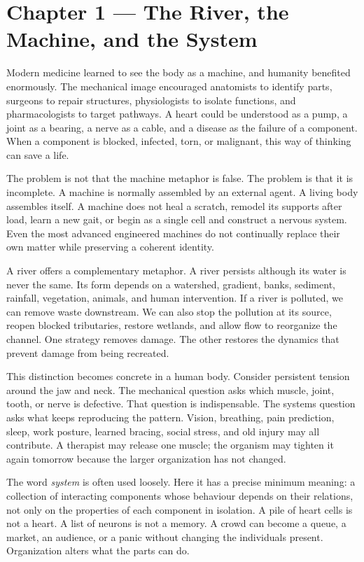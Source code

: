 \chapter{Chapter 1 --- The River, the Machine, and the System}\label{chapter-1-the-river-the-machine-and-the-system}

Modern medicine learned to see the body as a machine, and humanity benefited enormously. The mechanical image encouraged anatomists to identify parts, surgeons to repair structures, physiologists to isolate functions, and pharmacologists to target pathways. A heart could be understood as a pump, a joint as a bearing, a nerve as a cable, and a disease as the failure of a component. When a component is blocked, infected, torn, or malignant, this way of thinking can save a life.

The problem is not that the machine metaphor is false. The problem is that it is incomplete. A machine is normally assembled by an external agent. A living body assembles itself. A machine does not heal a scratch, remodel its supports after load, learn a new gait, or begin as a single cell and construct a nervous system. Even the most advanced engineered machines do not continually replace their own matter while preserving a coherent identity.

A river offers a complementary metaphor. A river persists although its water is never the same. Its form depends on a watershed, gradient, banks, sediment, rainfall, vegetation, animals, and human intervention. If a river is polluted, we can remove waste downstream. We can also stop the pollution at its source, reopen blocked tributaries, restore wetlands, and allow flow to reorganize the channel. One strategy removes damage. The other restores the dynamics that prevent damage from being recreated.

This distinction becomes concrete in a human body. Consider persistent tension around the jaw and neck. The mechanical question asks which muscle, joint, tooth, or nerve is defective. That question is indispensable. The systems question asks what keeps reproducing the pattern. Vision, breathing, pain prediction, sleep, work posture, learned bracing, social stress, and old injury may all contribute. A therapist may release one muscle; the organism may tighten it again tomorrow because the larger organization has not changed.

The word \emph{system} is often used loosely. Here it has a precise minimum meaning: a collection of interacting components whose behaviour depends on their relations, not only on the properties of each component in isolation. A pile of heart cells is not a heart. A list of neurons is not a memory. A crowd can become a queue, a market, an audience, or a panic without changing the individuals present. Organization alters what the parts can do.

